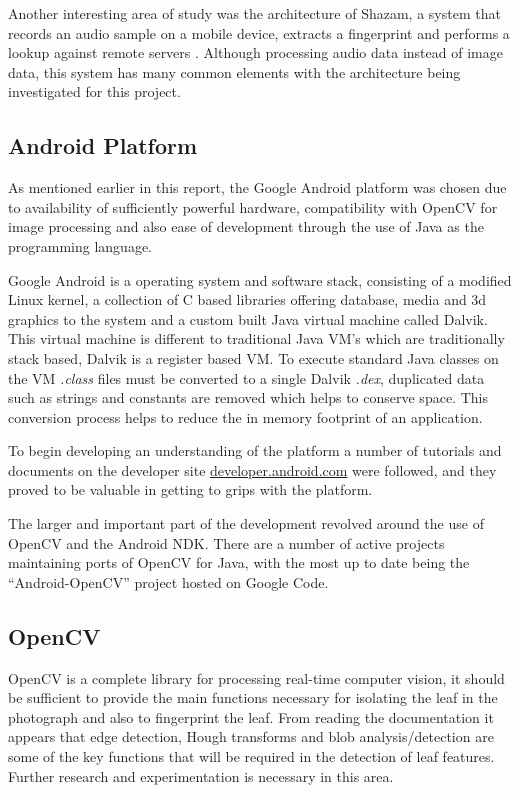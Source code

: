 Another interesting area of study was the architecture of Shazam, a system that records an audio sample on a mobile device, extracts a fingerprint and performs a lookup against remote servers \cite{laplacian09, redcode10}. Although processing audio data instead of image data, this system has many common elements with the architecture being investigated for this project.

\subsection*{Android Platform}
As mentioned earlier in this report, the Google Android platform was chosen due to availability of sufficiently powerful hardware, compatibility with OpenCV for image processing and also ease of development through the use of Java as the programming language.

Google Android is a operating system and software stack, consisting of a modified Linux kernel, a collection of C based libraries offering database, media and 3d graphics to the system and a custom built Java virtual machine called Dalvik. This virtual machine is different to traditional Java VM’s which are traditionally stack based, Dalvik is a register based VM. To execute standard Java classes on the VM \emph{.class} files must be converted to a single Dalvik \emph{.dex}, duplicated data such as strings and constants are removed which helps to conserve space. This conversion process helps to reduce the in memory footprint of an application.

To begin developing an understanding of the platform a number of tutorials and documents on the developer site \url{developer.android.com} were followed, and they proved to be valuable in getting to grips with the platform. 

The larger and important part of the development revolved around the use of OpenCV and the Android NDK. There are a number of active projects maintaining ports of OpenCV for Java, with the most up to date being the “Android-OpenCV” project hosted on Google Code.

\subsection*{OpenCV}
OpenCV is a complete library for processing real-time computer vision, it should be sufficient to provide the main functions necessary for isolating the leaf in the photograph and also to fingerprint the leaf. From reading the documentation it appears that edge detection, Hough transforms and blob analysis/detection are some of the key functions that will be required in the detection of leaf features. Further research and experimentation is necessary in this area.

